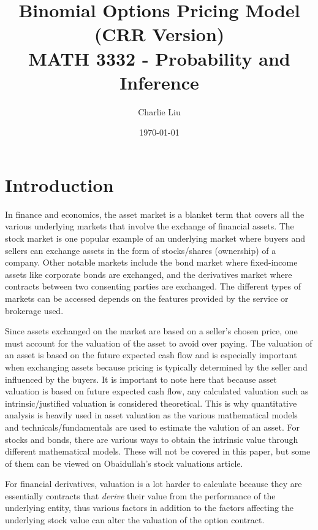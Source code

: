 \documentclass[12pt, letterpaper]{article}\usepackage{float}
\begin{document}
\setlength\parindent{1cm}

\title{Binomial Options Pricing Model (CRR Version)\\
\large MATH 3332 - Probability and Inference}
\author{Charlie Liu}
\date{\today}
\maketitle

\section*{Introduction}

In finance and economics, the asset market is a blanket term that covers all the various underlying markets that involve the exchange of financial assets.
The stock market is one popular example of an underlying market where buyers and sellers can exchange assets in the form of stocks/shares (ownership) of a company.
Other notable markets include the bond market where fixed-income assets like corporate bonds are exchanged, and the derivatives market where contracts between two consenting parties are exchanged.
The different types of markets can be accessed depends on the features provided by the service or brokerage used.

\medskip

Since assets exchanged on the market are based on a seller's chosen price, one must account for the valuation of the asset to avoid over paying.
The valuation of an asset is based on the future expected cash flow\cite{damodaran} and is especially important when exchanging assets because pricing is typically determined by the seller and influenced by the buyers.
It is important to note here that because asset valuation is based on future expected cash flow, any calculated valuation such as intrinsic/justified valuation is considered theoretical.
This is why quantitative analysis is heavily used in asset valuation as the various mathematical models and technicals/fundamentals are used to estimate the valution of an asset.
For stocks and bonds, there are various ways to obtain the intrinsic value through different mathematical models.
These will not be covered in this paper, but some of them can be viewed on Obaidullah's stock valuations article\cite{obaidullahxplaind}.

\medskip

For financial derivatives, valuation is a lot harder to calculate because they are essentially contracts that \textit{derive} their value from the performance of the underlying entity\cite{derivativefinancewikipedia}, thus various factors in addition to the factors affecting the underlying stock value can alter the valuation of the option contract. 
\end{document}
